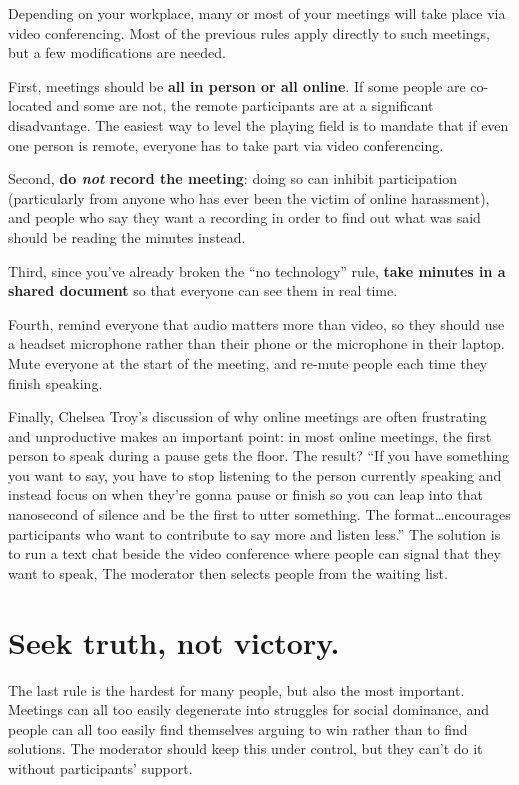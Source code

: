 \documentclass[10pt,letterpaper]{article}
\newcommand{\rulemajor}[1]{\section{#1}}
\begin{document}
Depending on your workplace, many or most of your  meetings will take place via
video conferencing. Most of the previous rules apply directly to such meetings,
but a few modifications are needed.

First, meetings should be \textbf{all in person or all online}. If some people
are co-located and some are not, the remote participants are at a significant
disadvantage. The easiest way to level the playing field is to mandate that if
even one person is remote, everyone has to take part via video conferencing.

Second, \textbf{do \emph{not} record the meeting}: doing so can inhibit
participation (particularly from anyone who has ever been the victim of online
harassment), and people who say they want a recording in order to find out what
was said should be reading the minutes instead.

Third, since you've already broken the ``no technology'' rule, \textbf{take
minutes in a shared document} so that everyone can see them in real time.

Fourth, remind everyone that audio matters more than video, so they should use a
headset microphone rather than their phone or the microphone in their laptop.
Mute everyone at the start of the meeting, and re-mute people each time they
finish speaking.

Finally, Chelsea Troy's discussion of why online meetings are often frustrating
and unproductive \cite{Troy2018} makes an important point: in most online
meetings, the first person to speak during a pause gets the floor.  The result?
``If you have something you want to say, you have to stop listening to the
person currently speaking and instead focus on when they're gonna pause or
finish so you can leap into that nanosecond of silence and be the first to utter
something.  The format{\ldots}encourages participants who want to contribute to
say more and listen less.''  The solution is to run a text chat beside the video
conference where people can signal that they want to speak, The moderator then
selects people from the waiting list.

\rulemajor{Seek truth, not victory.}

The last rule is the hardest for many people, but also the most important.
Meetings can all too easily degenerate into struggles for social dominance, and
people can all too easily find themselves arguing to win rather than to find
solutions.  The moderator should keep this under control, but they can't do it
without participants' support.
\end{document}
